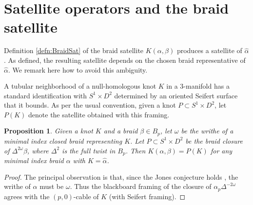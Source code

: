 \documentclass[11pt]{amsart}
\def\C{{\mathbb C}}
\def\A{{\mathcal A}}
\newtheorem{prop}[thm]{Proposition}
\theoremstyle{definition}
\begin{document}








\section{Satellite operators and the braid satellite}
\label{SecAsSatelliteOp}

Definition \ref{defn:BraidSat} of the braid satellite $K(\alpha,\beta)$ produces a satellite of $\hat{\alpha}$. As defined, the resulting satellite depends on the chosen braid representative of $\hat{\alpha}$. We remark here how to avoid this ambiguity.

A tubular neighborhood of a null-homologous knot $K$ in a 3-manifold has a standard identification with $S^1\times D^2$ determined by an oriented Seifert surface that it bounds. As per the usual convention, given a knot $P\subset S^1\times D^2$, let $P(K)$ denote the satellite obtained with this framing.

\begin{prop}\label{PropAsSatelliteOp}Given a knot $K$ and a braid $\beta\in B_p$, let $\omega$ be the writhe of a minimal index closed braid representing $K$. Let $P\subset S^1\times D^2$ be the braid closure of $\Delta^{2\omega}\beta$, where $\Delta^2$ is the full twist in $B_p$. Then $K(\alpha,\beta) = P(K)$ for any minimal index braid $\alpha$ with $K=\hat{\alpha}$.
\end{prop}
\begin{proof}The principal observation is that, since the Jones conjecture holds \cite{DP12,LM12}, the writhe of $\alpha$ must be $\omega$. Thus the blackboard framing of the closure of $\alpha_p\Delta^{-2\omega}$ agrees with the $(p,0)$-cable of $K$ (with Seifert framing).
\end{proof}
\end{document}
